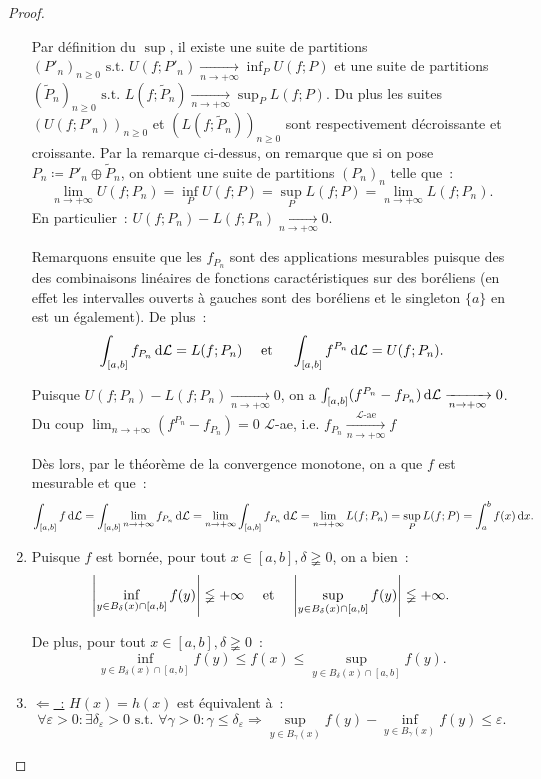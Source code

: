 \documentclass{article}
\newcommand{\pinfty}{{+\infty}}
\newcommand{\st}{\text{ s.t. }}
\begin{document}
\begin{proof}
\begin{enumerate}
	Par définition du $\sup$, il existe une suite de partitions $(P'_n)_{n \geq 0} \st U(f; P'_n) \xrightarrow[n \to \pinfty]{} \inf_PU(f; P)$ et
	une suite de partitions $(\tilde P_n)_{n \geq 0} \st L(f; \tilde P_n) \xrightarrow[n \to \pinfty]{} \sup_PL(f; P)$. Du plus les suites $(U(f; P'_n))_{n \geq 0}$
	et $(L(f; \tilde P_n))_{n \geq 0}$ sont respectivement décroissante et croissante. Par la remarque ci-dessus, on remarque que si on pose $P_n \coloneqq P'_n \oplus \tilde P_n$,
	on obtient une suite de partitions $(P_n)_n$ telle que~:
	\[\lim_{n \to \pinfty}U(f; P_n) = \inf_PU(f; P) = \sup_PL(f; P) = \lim_{n \to \pinfty} L(f; P_n).\]
	En particulier~: $U(f; P_n) - L(f; P_n) \xrightarrow[n \to \pinfty]{} 0$.

	Remarquons ensuite que les $f_{P_n}$ sont des applications mesurables puisque des des combinaisons linéaires de fonctions caractéristiques sur des boréliens (en effet
	les intervalles ouverts à gauches sont des boréliens et le singleton $\{a\}$ en est un également). De plus~:
	\[\int_{[a, b]} f_{P_n}\dif\mathcal L = L(f; P_n) \quad\text{ et }\quad \int_{[a, b]} f^{P_n}\dif\mathcal L = U(f; P_n).\]

	Puisque $U(f; P_n) - L(f; P_n) \xrightarrow[n \to \pinfty]{} 0$, on a $\int_{[a, b]}(f^{P_n}-f_{P_n})\dif \mathcal L \xrightarrow[n \to \pinfty]{} 0$.
	Du coup $\lim_{n \to \pinfty}(f^{P_n} - f_{P_n}) = 0$ $\mathcal L$-ae, i.e. $f_{P_n} \xrightarrow[n \to \pinfty]{\mathcal L\text{-ae}} f$

	Dès lors, par le théorème de la convergence monotone, on a que $f$ est mesurable et que~:
	\[\int_{[a, b]} f\dif\mathcal L = \int_{[a, b]} \lim_{n \to \pinfty}f_{P_n}\dif\mathcal L = \lim_{n \to \pinfty}\int_{[a, b]}f_{P_n}\dif\mathcal L = \lim_{n \to \pinfty}L(f; P_n)
	= \sup_PL(f; P) = \int_a^bf(x)\dif x.\]

	\item Puisque $f$ est bornée, pour tout $x \in [a, b], \delta \gneqq 0$, on a bien~:
	\[\abs {\inf_{y \in B_\delta(x) \cap [a, b]}f(y)} \lneqq \pinfty \quad\text{ et }\quad \abs {\sup_{y \in B_\delta(x) \cap [a, b]}f(y)} \lneqq \pinfty.\]

	De plus, pour tout $x \in [a, b], \delta \gneqq 0$~:
	\[\inf_{y \in B_\delta(x) \cap [a, b]} f(y) \leq f(x) \leq \sup_{y \in B_\delta(x) \cap [a, b]}f(y).\]

	\item \underline {$\Leftarrow$~:} $H(x) = h(x)$ est équivalent à~:
	\[\forall \varepsilon > 0 : \exists \delta_\varepsilon > 0 \st \forall \gamma > 0 : \gamma \leq \delta_\varepsilon \Rightarrow
	\sup_{y \in B_\gamma(x)}f(y) - \inf_{y \in B_\gamma(x)}f(y) \leq \varepsilon.\]


\end{enumerate}
\end{proof}
\end{document}
